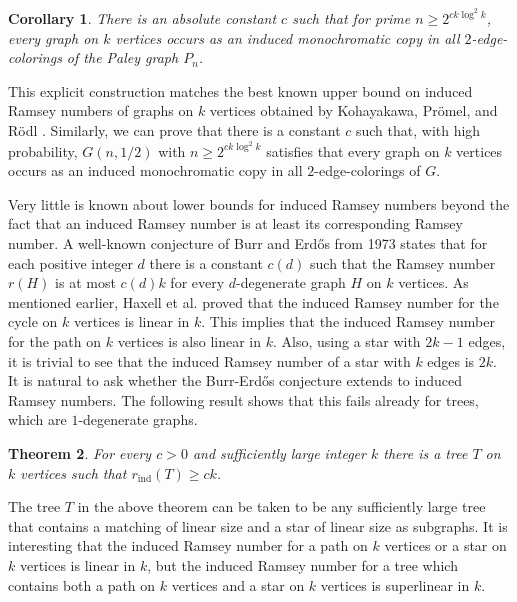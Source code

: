 \documentclass[11pt]{article}
\newtheorem{theorem}{Theorem}[section]
\newtheorem{corollary}[theorem]{Corollary}
\begin{document}
\begin{corollary}\label{payley}
There is an absolute constant $c$ such that for prime $n \geq
2^{ck\log^2 k}$, every graph on $k$ vertices occurs as an
induced monochromatic copy in all $2$-edge-colorings of the Paley graph $P_n$.
\end{corollary}

This explicit construction matches the best known upper bound on
induced Ramsey numbers of graphs on $k$ vertices obtained by
Kohayakawa, Pr\"omel, and R\"odl \cite{KoPrRo}. Similarly, we can
prove that there is a constant $c$ such that, with high probability,
$G(n,1/2)$ with $n \geq 2^{ck\log^2 k}$ satisfies that every graph
on $k$ vertices occurs as an induced monochromatic copy in all
$2$-edge-colorings of $G$.

Very little is known about lower bounds for induced Ramsey numbers
beyond the fact that an induced Ramsey number is at least its
corresponding Ramsey number. A well-known conjecture of Burr and
Erd\H{o}s \cite{BuEr} from 1973 states that for each positive
integer $d$ there is a constant $c(d)$ such that the Ramsey number
$r(H)$ is at most $c(d)k$ for every $d$-degenerate graph $H$ on $k$
vertices. As mentioned earlier, Haxell et al. \cite{HaKoLu} proved
that the induced Ramsey number for the cycle on $k$
vertices is linear in $k$. This implies that the induced
Ramsey number for the path on $k$ vertices is also linear in $k$.
Also, using a star with $2k-1$ edges, it is trivial to see that the induced Ramsey number of a star
with $k$ edges is $2k$. It is natural to ask whether the
Burr-Erd\H{o}s conjecture extends to induced Ramsey numbers. The
following result shows that this fails already for trees, which are
$1$-degenerate graphs.

\begin{theorem} \label{tree} For every $c>0$ and sufficiently large integer $k$
there is  a tree $T$ on $k$ vertices such that
$r_{\textrm{ind}}(T) \geq ck$.
\end{theorem}

The tree $T$ in the above theorem can be taken to be any
sufficiently large tree that contains a matching of linear size and
a star of linear size as subgraphs. It is interesting that the
induced Ramsey number for a path on $k$ vertices or a star on $k$
vertices is linear in $k$, but the induced Ramsey number for a tree
which contains both a path on $k$ vertices and a star on $k$
vertices is superlinear in $k$.
\end{document}
